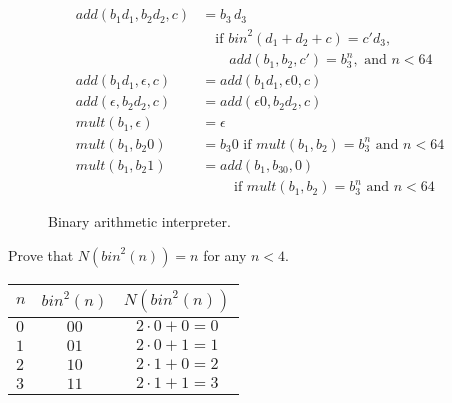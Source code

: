 \documentclass{tufte-handout}
\begin{document}
\begin{figure}[tbp]
\begin{align*}
   \\
  \mathit{add}(b_1 d_1 , b_2 d_2, c) &=  b_3\,d_3 \\
  & \quad \text{if } \mathit{bin}^2(d_1+ d_2+ c) = c' d_3,\\
  & \qquad  \mathit{add}(b_1, b_2, c') = b^n_3, \text{ and } n < 64 \\
\mathit{add}(b_1 d_1 , \epsilon, c) &= 
  \mathit{add}(b_1 d_1 , \epsilon 0, c) \\
\mathit{add}(\epsilon, b_2 d_2, c) &= 
\mathit{add}( \epsilon 0, b_2 d_2,c)
\\[2ex]
\mathit{mult}(b_1, \epsilon) &= \epsilon \\
\mathit{mult}(b_1, b_2 0) &= b_3 0
  \text{ if } \mathit{mult}(b_1,b_2) = b^n_3 \text{ and } n < 64 \\
 \mathit{mult}(b_1, b_2 1) &= 
   \mathit{add}(b_1, b_30, 0) \\
  & \qquad \text{ if } \mathit{mult}(b_1,b_2) = b^n_3 \text{ and } n < 64
\end{align*}
\caption{Binary arithmetic interpreter.}
\label{fig:interp-binary}
\end{figure}


\begin{Exercise}
\label{ex:bit-add}
Prove that 
$N (\mathit{bin}^2(n)) = n$ for any $n < 4$.
\end{Exercise}
\begin{Answer}
\begin{tabular}{l|c|c} 
  $n$ & $\mathit{bin}^2(n)$ & $N(\mathit{bin}^2(n))$ \\ \hline
  $0$ & $00$ & $2\cdot 0 + 0 = 0$ \\
  $1$ & $01$ & $2\cdot 0 + 1 = 1$\\
  $2$ & $10$ & $2\cdot 1 + 0 = 2$ \\
  $3$ & $11$ & $2\cdot 1 + 1 = 3$ 
\end{tabular} 
\end{Answer}
\end{document}
